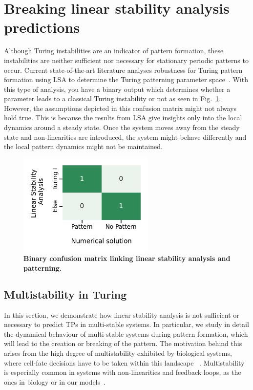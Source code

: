 \section{Breaking linear stability analysis predictions}
Although Turing instabilities are an indicator of pattern formation, these instabilities are neither sufficient nor necessary for stationary periodic patterns to occur.
Current state-of-the-art literature analyses robustness for Turing pattern formation using LSA to determine the Turing patterning parameter space~\parencite{Scholes2019, Zheng2016, Marcon}.
With this type of analysis, you have a binary output which determines whether a parameter leads to a classical Turing instability or not as seen in Fig.~\ref{fig:lsa_numerical_confusion_literature}.
However, the assumptions depicted in this confusion matrix might not always hold true.
This is because the results from LSA give insights only into the local dynamics around a steady state.
Once the system moves away from the steady state and non-linearities are introduced, the system might behave differently and the local pattern dynamics might not be maintained.


\begin{figure}[H] %
    \centering
    \includegraphics[width=0.6\textwidth]{chapters/Chapter 1/lsa_vs_numerical_confusion_literature} %
    \caption{\textbf{Binary confusion matrix linking linear stability analysis and patterning.}}
    \label{fig:lsa_numerical_confusion_literature} %
\end{figure}


\subsection{Multistability in Turing}
In this section, we demonstrate how linear stability analysis is not sufficient or necessary to predict TPs in multi-stable systems.
In particular, we study in detail the dynamical behaviour of multi-stable systems during pattern formation, which will lead to the creation or breaking of the pattern.
The motivation behind this arises from the high degree of multistability exhibited by biological systems, where cell-fate decisions have to be taken within this landscape ~\parencite{huang2000shape, moris2016transition}.
Multistability is especially common in systems with non-linearities and feedback loops, as the ones in biology or in our models~\parencite{pham2020complexity, leite2009multistability}.

